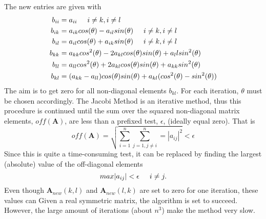 \documentclass[%
oneside,                 %
final,                   %
10pt]{article}
\begin{document}
The new entries are given with
\begin{equation}
\begin{aligned}
b_{ii} &= a_{ii} \hspace{0.5cm} i \neq k, i \neq l \\
b_{ik} &= a_{ik}cos(\theta) - a_{il}sin(\theta) \hspace{0.5cm} i \neq k, i \neq l \\
b_{il} &= a_{il}cos(\theta) + a_{ik}sin(\theta) \hspace{0.5cm} i \neq k, i \neq l\\
b_{kk} &= a_{kk}cos^2(\theta) -2a_{kl}cos(\theta)sin(\theta) + a_llsin^2(\theta)\\
b_{ll} &= a_{ll}cos^2(\theta) + 2a_{kl}cos(\theta)sin(\theta) + a_{kk}sin^2(\theta)\\
b_{kl} &= (a_{kk}-a_{ll})cos(\theta)sin(\theta) + a_{kl}(cos^2(\theta)-sin^2(\theta))
\end{aligned}
\end{equation}
The aim is to get zero for all non-diagonal elements $b_{kl}$. For each iteration, $\theta$ must be chosen accordingly. 
The Jacobi Method is an iterative method, thus this procedure is continued until the sum over the squared non-diagonal matrix elements, $off(\mathbf{A})$, are less than a prefixed test, $\epsilon$, (ideally equal zero). That is
\begin{equation}
off(\mathbf{A}) = \sqrt{\sum_{i=1}^{n} \sum_{j=1, j \neq i}^{n} = |a_{ij}|^2} < \epsilon
\end{equation}
Since this is quite a time-consuming test, it can be replaced by finding the largest (absolute) value of the off-diagonal elements
\begin{equation}
max|a_{ij}| < \epsilon \hspace{0.5cm} i \neq j.
\end{equation}
Even though $\mathbf{A}_  {new}(k,l)$ and $ \mathbf{A}_{new}(l,k)$ are set to zero for one iteration, these values can 
Given a real symmetric matrix, the algorithm is set to succeed. However, the large amount of iterations (about $n^3$) make the method very slow.


\end{document}
